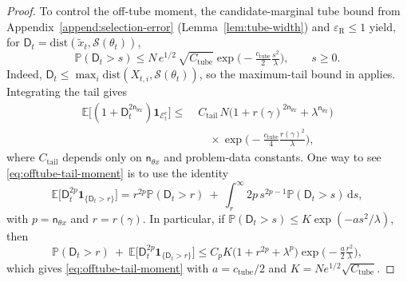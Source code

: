\documentclass{article}
\theoremstyle{normaltheorem}
\newcommand{\ud}{\mathrm{d}}
\newcommand{\calS}{\mathcal{S}}
\begin{document}
\begin{proof}
To control the off-tube moment, the candidate-marginal tube bound from Appendix~\ref{append:selection-error}
(Lemma~\ref{lem:tube-width}) and \(\varepsilon_{\mathrm R}\le1\) yield, for
\(\mathsf{D}_{t}=\mathrm{dist}(\tilde x_t,\calS(\theta_t))\),
\[
\mathbb P(\mathsf{D}_{t}>s)
\le
N\,e^{1/2}\,\sqrt{C_{\mathrm{tube}}}
\exp\!\Big(-\tfrac{c_{\mathrm{tube}}}{2}\tfrac{s^2}{\lambda}\Big),
\qquad s\ge 0.
\]
Indeed, \(\mathsf{D}_{t}\le \max_i\mathrm{dist}(X_{t,i},\calS(\theta_t))\), so the maximum-tail bound in
 applies. Integrating the tail gives
\begin{equation}\label{eq:offtube-tail-moment}
\begin{aligned}
\mathbb E\big[(1+\mathsf{D}_{t}^{2\mathsf n_{\theta x}})\mathbf 1_{\mathcal E_t^c}\big]
\le\;&
C_{\mathrm{tail}}\,N
\big(1+r(\gamma)^{2\mathsf n_{\theta x}}+\lambda^{\mathsf n_{\theta x}}\big)\\
&\quad\times
\exp\!\Big(-\tfrac{c_{\mathrm{tube}}}{4}\tfrac{r(\gamma)^2}{\lambda}\Big),
\end{aligned}
\end{equation}
where \(C_{\mathrm{tail}}\) depends only on \(\mathsf n_{\theta x}\) and problem-data constants. One way to see
\eqref{eq:offtube-tail-moment} is to use the identity
\[
\mathbb E\big[\mathsf{D}_{t}^{2p}\mathbf 1_{\{\mathsf{D}_{t}>r\}}\big]
=
r^{2p}\mathbb P(\mathsf{D}_{t}>r)
\ +\ \int_r^\infty 2p\,s^{2p-1}\mathbb P(\mathsf{D}_{t}>s)\,\ud s,
\]
with \(p=\mathsf n_{\theta x}\) and \(r=r(\gamma)\). In particular, if
\(\mathbb P(\mathsf{D}_{t}>s)\le K\exp(-a s^2/\lambda)\), then
\[
\mathbb P(\mathsf{D}_{t}>r)
\ +\ \mathbb E\big[\mathsf{D}_{t}^{2p}\mathbf 1_{\{\mathsf{D}_{t}>r\}}\big]
\le
C_pK\big(1+r^{2p}+\lambda^p\big)
\exp\!\Big(-\tfrac{a}{2}\tfrac{r^2}{\lambda}\Big),
\]
which gives \eqref{eq:offtube-tail-moment} with \(a=c_{\mathrm{tube}}/2\) and
\(K=N e^{1/2}\sqrt{C_{\mathrm{tube}}}\).


\end{proof}
\end{document}
